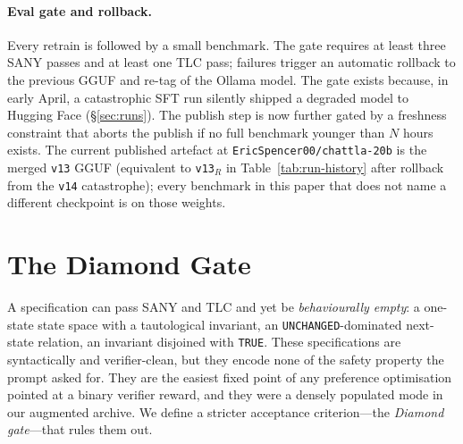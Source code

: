 \documentclass[11pt]{article}
\begin{document}
\paragraph{Eval gate and rollback.} Every retrain is followed by a small
benchmark. The gate requires at least three SANY passes and at least
one TLC pass; failures trigger an automatic rollback to the previous
GGUF and re-tag of the Ollama model. The gate exists because, in early
April, a catastrophic SFT run silently shipped a degraded model to
Hugging Face (\S\ref{sec:runs}). The publish step is now further gated
by a freshness constraint that aborts the publish if no full benchmark
younger than $N$ hours exists. The current published artefact at
\texttt{EricSpencer00/chattla-20b} is the merged \texttt{v13} GGUF
(equivalent to \texttt{v13}$_R$ in Table~\ref{tab:run-history} after
rollback from the \texttt{v14} catastrophe); every benchmark in this
paper that does not name a different checkpoint is on those weights.

\section{The Diamond Gate}
\label{sec:diamond}

A specification can pass SANY and TLC and yet be \emph{behaviourally
empty}: a one-state state space with a tautological invariant, an
\texttt{UNCHANGED}-dominated next-state relation, an invariant disjoined
with \texttt{TRUE}. These specifications are syntactically and
verifier-clean, but they encode none of the safety property the prompt
asked for. They are the easiest fixed point of any preference
optimisation pointed at a binary verifier reward, and they were a
densely populated mode in our augmented archive. We define a stricter
acceptance criterion---the \emph{Diamond gate}---that rules them out.
\end{document}
